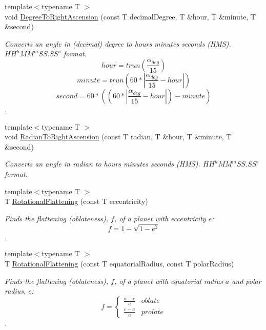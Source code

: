 \begin{DoxyCompactItemize}
{\footnotesize template$<$typename T $>$ }\\void \mbox{\hyperlink{group___e_g_x_phys-_astrophysics-_right_ascension_ga6fdbd35a030d278f396496899a1c236f}{Degree\+To\+Right\+Ascension}} (const T decimal\+Degree, T \&hour, T \&minute, T \&second)
\begin{DoxyCompactList}\small\item\em Converts an angle in (decimal) degree to hours minutes seconds (H\+MS). ${HH}^{h}{MM}^{m}{SS.SS}^{s}$ format. \[hour=trun(\frac{\alpha_{deg}}{15})\] \[minute=trun(60 * |\frac{\alpha_{deg}}{15} - hour|)\] \[second=60 * ((60 * |\frac{\alpha_{deg}}{15} - hour|)-minute)\]. \end{DoxyCompactList}\item 
{\footnotesize template$<$typename T $>$ }\\void \mbox{\hyperlink{group___e_g_x_phys-_astrophysics-_right_ascension_ga624dd87144a17d19d0100500c34da978}{Radian\+To\+Right\+Ascension}} (const T radian, T \&hour, T \&minute, T \&second)
\begin{DoxyCompactList}\small\item\em Converts an angle in radian to hours minutes seconds (H\+MS). ${HH}^h{MM}^m{SS.SS}^s$ format. \end{DoxyCompactList}\item 
{\footnotesize template$<$typename T $>$ }\\T \mbox{\hyperlink{group___e_g_x_phys-_astrophysics-_rotational_flattening_gabba90db442c4ec9e12523adb00d66c44}{Rotational\+Flattening}} (const T eccentricity)
\begin{DoxyCompactList}\small\item\em Finds the flattening (oblateness), $f$, of a planet with eccentricity $e$\+: \[ f = 1 - \sqrt{1-e^2} \]. \end{DoxyCompactList}\item 
{\footnotesize template$<$typename T $>$ }\\T \mbox{\hyperlink{group___e_g_x_phys-_astrophysics-_rotational_flattening_ga1840fed2081c35f68c4b8bfa75248977}{Rotational\+Flattening}} (const T equatorial\+Radius, const T polar\+Radius)
\begin{DoxyCompactList}\small\item\em Finds the flattening (oblateness), $f$, of a planet with equatorial radius $a$ and polar radius, $c$\+: \[ f =\begin{cases} \frac{a-c}{a}{} & oblate \\ \frac{c-a}{a} & prolate \end{cases} \]. \end{DoxyCompactList}\item 

\end{DoxyCompactItemize}
